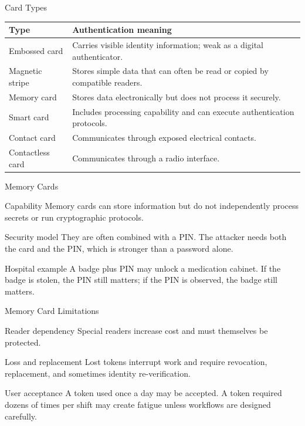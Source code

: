 \documentclass[presentation]{beamer}
\begin{document}
\begin{frame}[c]{Card Types}
  \small
  \begin{tabularx}{\textwidth}{@{}p{}X@{}}
    \toprule
    \textbf{Type} & \textbf{Authentication meaning} \\
    \midrule
    Embossed card & Carries visible identity information; weak as a digital authenticator. \\
    Magnetic stripe & Stores simple data that can often be read or copied by compatible readers. \\
    Memory card & Stores data electronically but does not process it securely. \\
    Smart card & Includes processing capability and can execute authentication protocols. \\
    Contact card & Communicates through exposed electrical contacts. \\
    Contactless card & Communicates through a radio interface. \\
    \bottomrule
  \end{tabularx}
\end{frame}

\begin{frame}[c]{Memory Cards}
  \begin{block}{Capability}
    Memory cards can store information but do not independently process secrets or run cryptographic protocols.
  \end{block}

  \begin{block}{Security model}
    They are often combined with a PIN. The attacker needs both the card and the PIN, which is stronger than a password alone.
  \end{block}

  \begin{exampleblock}{Hospital example}
    A badge plus PIN may unlock a medication cabinet. If the badge is stolen, the PIN still matters; if the PIN is observed, the badge still matters.
  \end{exampleblock}
\end{frame}

\begin{frame}[c]{Memory Card Limitations}
  \begin{block}{Reader dependency}
    Special readers increase cost and must themselves be protected.
  \end{block}

  \begin{block}{Loss and replacement}
    Lost tokens interrupt work and require revocation, replacement, and sometimes identity re-verification.
  \end{block}

  \begin{block}{User acceptance}
    A token used once a day may be accepted. A token required dozens of times per shift may create fatigue unless workflows are designed carefully.
  \end{block}
\end{frame}
\end{document}

